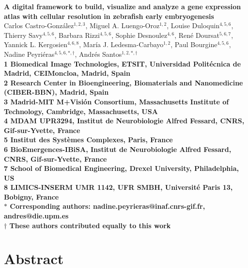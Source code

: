 

\begin{flushleft}
{\Large
\textbf{A digital framework to build, visualize and analyze a gene expression atlas with cellular resolution in zebrafish early embryogenesis}
}
\\
Carlos Castro-Gonz{\'a}lez$^{1,2,3}$,
Miguel A. Luengo-Oroz$^{1,2}$,
Louise Duloquin$^{4,5,6}$,
Thierry Savy$^{4,5,6}$,
Barbara Rizzi$^{4,5,6}$,
Sophie Desnoulez$^{4,6}$,
Ren{\'e} Doursat$^{5,6,7}$,
Yannick L. Kergosien$^{4,6,8}$,
Mar{\'i}a J. Ledesma-Carbayo$^{1,2}$,
Paul Bourgine$^{4,5,6}$,
Nadine Peyri{\'e}ras$^{4,5,6,\ast,\dag}$,
Andr{\'e}s Santos$^{1,2,\ast,\dag}$
\\
\bf{1} Biomedical Image Technologies, ETSIT, Universidad Polit{\'e}cnica de Madrid, CEIMoncloa, Madrid, Spain
\\
\bf{2} Research Center in Bioengineering, Biomaterials and Nanomedicine (CIBER-BBN), Madrid, Spain
\\
\bf{3} Madrid-MIT M+Visi{\'o}n Consortium, Massachusetts Institute of Technology, Cambridge, Massachusetts, USA
\\
\bf{4} MDAM UPR3294, Institut de Neurobiologie Alfred Fessard, CNRS, Gif-sur-Yvette, France
\\
\bf{5} Institut des Syst{\`e}mes Complexes, Paris, France
\\
\bf{6} BioEmergences-IBiSA, Institut de Neurobiologie Alfred Fessard, CNRS, Gif-sur-Yvette, France
\\
\bf{7} School of Biomedical Engineering, Drexel University, Philadelphia, US
\\
\bf{8} LIMICS-INSERM UMR 1142, UFR SMBH, Universit{\'e} Paris 13, Bobigny, France
\\
$\ast$ Corresponding authors: nadine.peyrieras@inaf.cnrs-gif.fr, andres@die.upm.es
\\
$\dag$ These authors contributed equally to this work
\end{flushleft}

\section*{Abstract}

